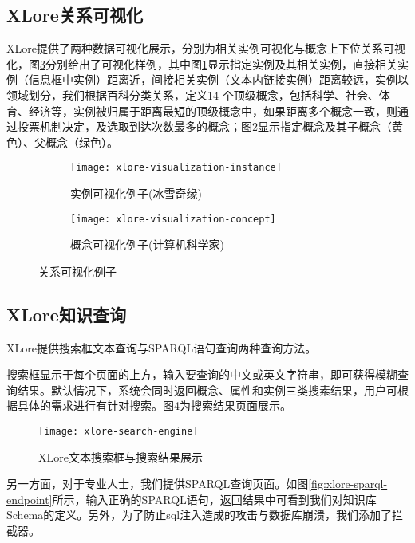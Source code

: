 \subsection{XLore关系可视化}
\label{sec5:xlore-visualization}
XLore提供了两种数据可视化展示，分别为相关实例可视化与概念上下位关系可视化，图\ref{fig:xlore-visualization}分别给出了可视化样例，其中图\ref{fig:xlore-visualization-instance}显示指定实例及其相关实例，直接相关实例（信息框中实例）距离近，间接相关实例（文本内链接实例）距离较远，实例以领域划分，我们根据百科分类关系，定义14 个顶级概念，包括科学、社会、体育、经济等，实例被归属于距离最短的顶级概念中，如果距离多个概念一致，则通过投票机制决定，及选取到达次数最多的概念；图\ref{fig:xlore-visualization-concept}显示指定概念及其子概念（黄色）、父概念（绿色）。

\begin{figure}[ht]
  \centering
  \begin{subfigure}{7.2cm}
    \texttt{[image: xlore-visualization-instance]}
    \caption{实例可视化例子(冰雪奇缘)}
  \label{fig:xlore-visualization-instance}
  \end{subfigure}
  \hspace{0.01cm}%
  \begin{subfigure}{7.2cm}
    \texttt{[image: xlore-visualization-concept]}
    \caption{概念可视化例子(计算机科学家)}
  \label{fig:xlore-visualization-concept}
  \end{subfigure}
  \caption{关系可视化例子}
  \label{fig:xlore-visualization}
\end{figure}

\subsection{XLore知识查询}
\label{sec5:xlore-knowledge-search}
XLore提供搜索框文本查询与SPARQL语句查询两种查询方法。

搜索框显示于每个页面的上方，输入要查询的中文或英文字符串，即可获得模糊查询结果。默认情况下，系统会同时返回概念、属性和实例三类搜素结果，用户可根据具体的需求进行有针对搜索。图\ref{fig:xlore-search-engine}为搜索结果页面展示。

\begin{figure}[ht]
  \centering
  \texttt{[image: xlore-search-engine]}
  \caption{XLore文本搜索框与搜索结果展示}
  \label{fig:xlore-search-engine}
\end{figure}

另一方面，对于专业人士，我们提供SPARQL查询页面。如图\ref{fig:xlore-sparql-endpoint}所示，输入正确的SPARQL语句，返回结果中可看到我们对知识库Schema的定义。另外，为了防止sql注入造成的攻击与数据库崩溃，我们添加了拦截器。

